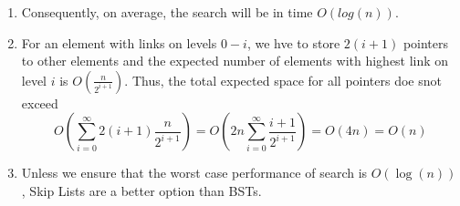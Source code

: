\documentclass[12pt, letterpaper]{article}
\begin{document}
\begin{enumerate}
    \item Consequently, on average, the search will be in time $O(log(n))$.
    \item For an element with links on levels $0 - i$, we hve to store $2(i + 1)$ pointers to other elements and the expected number of elements with highest link on level $i$ is $O(\frac{n}{2^{i + 1}})$. Thus, the total expected space for all pointers doe snot exceed \[O(\sum_{i=0}^{\infty}2(i + 1)\frac{n}{2^{i + 1}}) = O(2n\sum_{i = 0}^{\infty}\frac{i + 1}{2^{i + 1}}) = O(4n) = O(n)\]
    \item Unless we ensure that the worst case performance of search is $O(\log(n))$, Skip Lists are a better option than BSTs.
\end{enumerate}
\end{document}
